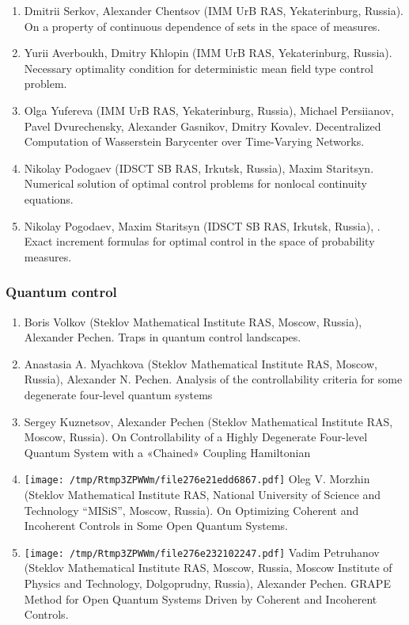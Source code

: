 \documentclass[
]{article}
\providecommand{\tightlist}{%
  \setlength{\itemsep}{0pt}\setlength{\parskip}{0pt}}
\begin{document}
\begin{enumerate}
\def\labelenumi{\arabic{enumi}.}
\tightlist
\item
  Dmitrii Serkov, Alexander Chentsov (IMM UrB RAS, Yekaterinburg,
  Russia). On a property of continuous dependence of sets in the space
  of measures.
\item
  Yurii Averboukh, Dmitry Khlopin (IMM UrB RAS, Yekaterinburg, Russia).
  Necessary optimality condition for deterministic mean field type
  control problem.
\item
  Olga Yufereva (IMM UrB RAS, Yekaterinburg, Russia), Michael
  Persiianov, Pavel Dvurechensky, Alexander Gasnikov, Dmitry Kovalev.
  Decentralized Computation of Wasserstein Barycenter over Time-Varying
  Networks.
\item
  Nikolay Podogaev (IDSCT SB RAS, Irkutsk, Russia), Maxim Staritsyn.
  Numerical solution of optimal control problems for nonlocal continuity
  equations.
\item
  Nikolay Pogodaev, Maxim Staritsyn (IDSCT SB RAS, Irkutsk, Russia),
  . Exact increment formulas
  for optimal control in the space of probability measures.
\end{enumerate}

\hypertarget{qc}{%
\subsubsection{Quantum control}\label{qc}}

\begin{enumerate}
\def\labelenumi{\arabic{enumi}.}
\tightlist
\item
  Boris Volkov (Steklov Mathematical Institute RAS, Moscow, Russia),
  Alexander Pechen. Traps in quantum control landscapes.
\item
  Anastasia A. Myachkova (Steklov Mathematical Institute RAS, Moscow,
  Russia), Alexander N. Pechen. Analysis of the controllability criteria
  for some degenerate four-level quantum systems
\item
  Sergey Kuznetsov, Alexander Pechen (Steklov Mathematical Institute
  RAS, Moscow, Russia). On Controllability of a Highly Degenerate
  Four-level Quantum System with a «Chained» Coupling Hamiltonian
\item
  \protect\texttt{[image: /tmp/Rtmp3ZPWWm/file276e21edd6867.pdf]}
  Oleg V. Morzhin (Steklov Mathematical Institute RAS, National
  University of Science and Technology ``MISiS'', Moscow, Russia). On
  Optimizing Coherent and Incoherent Controls in Some Open Quantum
  Systems.
\item
  \protect\texttt{[image: /tmp/Rtmp3ZPWWm/file276e232102247.pdf]}
  Vadim Petruhanov (Steklov Mathematical Institute RAS, Moscow, Russia,
  Moscow Institute of Physics and Technology, Dolgoprudny, Russia),
  Alexander Pechen. GRAPE Method for Open Quantum Systems Driven by
  Coherent and Incoherent Controls.
\end{enumerate}
\end{document}
